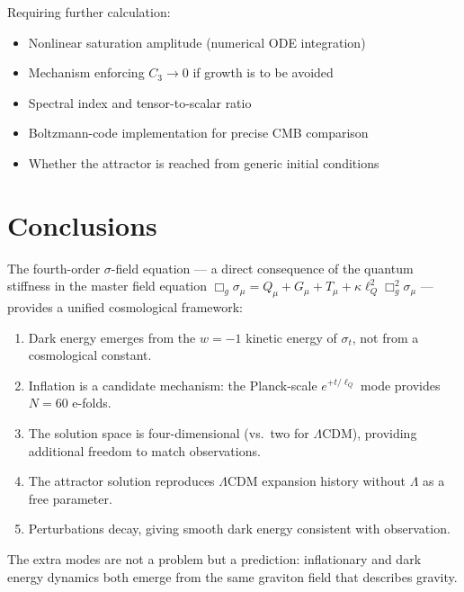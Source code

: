\documentclass[11pt,a4paper]{article}
\theoremstyle{plain}
\theoremstyle{definition}
\theoremstyle{remark}
\newcommand{\lQ}{\ell_Q}
\begin{document}
Requiring further calculation:
\begin{itemize}
  \item Nonlinear saturation amplitude (numerical ODE integration)
  \item Mechanism enforcing $C_3 \to 0$ if growth is to be avoided
  \item Spectral index and tensor-to-scalar ratio
  \item Boltzmann-code implementation for precise CMB comparison
  \item Whether the attractor is reached from generic initial conditions
\end{itemize}

\section{Conclusions}
\label{sec:conclusions}

The fourth-order $\sigma$-field equation --- a direct consequence of the quantum stiffness in the master field equation $\Box_g\sigma_\mu = Q_\mu + G_\mu + T_\mu + \kappa\lQ^2\Box_g^2\sigma_\mu$ --- provides a unified cosmological framework:

\begin{enumerate}
  \item Dark energy emerges from the $w = -1$ kinetic energy of $\sigma_t$, not from a cosmological constant.
  \item Inflation is a candidate mechanism: the Planck-scale $e^{+t/\lQ}$ mode provides $N = 60$ e-folds.
  \item The solution space is four-dimensional (vs.\ two for $\Lambda$CDM), providing additional freedom to match observations.
  \item The attractor solution reproduces $\Lambda$CDM expansion history without $\Lambda$ as a free parameter.
  \item Perturbations decay, giving smooth dark energy consistent with observation.
\end{enumerate}

The extra modes are not a problem but a prediction: inflationary and dark energy dynamics both emerge from the same graviton field that describes gravity.
\end{document}
